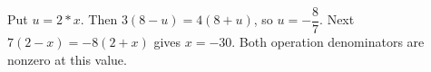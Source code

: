 Put $u=2*x$. Then $3(8-u)=4(8+u)$, so $u=-\dfrac{8}{7}$. Next $7(2-x)=-8(2+x)$ gives $\boxed{x=-30}$. Both operation denominators are nonzero at this value.
